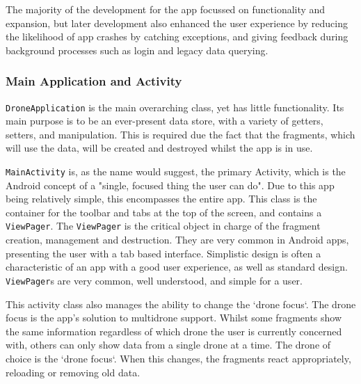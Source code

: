 \documentclass{article}
\begin{document}
The majority of the development for the app focussed on functionality and expansion, but later development also enhanced the user experience by reducing the likelihood of app crashes by catching exceptions, and giving feedback during background processes such as login and legacy data querying. 

\subsubsection{Main Application and Activity}
\texttt{DroneApplication} is the main overarching class, yet has little functionality. Its main purpose is to be an ever-present data store, with a variety of getters, setters, and manipulation. This is required due the fact that the fragments, which will use the data, will be created and destroyed whilst the app is in use. 

\texttt{MainActivity} is, as the name would suggest, the primary Activity, which is the Android concept of a "single, focused thing the user can do"\cite{androidActivity}. Due to this app being relatively simple, this encompasses the entire app. This class is the container for the toolbar and tabs at the top of the screen, and contains a \texttt{ViewPager}. The \texttt{ViewPager} is the critical object in charge of the fragment creation, management and destruction. They are very common in Android apps, presenting the user with a tab based interface. Simplistic design is often a characteristic of an app with a good user experience, as well as standard design. \texttt{ViewPager}s are very common, well understood, and simple for a user. 

This activity class also manages the ability to change the `drone focus`. The drone focus is the app's solution to multidrone support. Whilst some fragments show the same information regardless of which drone the user is currently concerned with, others can only show data from a single drone at a time. The drone of choice is the `drone focus`. When this changes, the fragments react appropriately, reloading or removing old data. 
\end{document}
